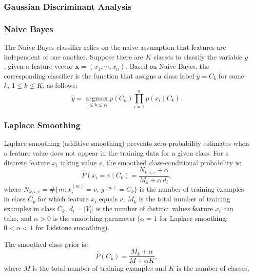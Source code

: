\documentclass{article}
\begin{document}
\subsubsection{Gaussian Discriminant Analysis}
\label{subsubsec:ml:gla:gda}

\subsubsection{Naive Bayes}
\label{subsubsec:ml:gla:nb}
The Naive Bayes classifier relies on the naive assumption that features are independent of one another. Suppose there are $K$ classes to classify the variable $y$, given a feature vector $\mathbf{x} = (x_1, \cdots, x_n)$. Based on Naive Bayes, the corresponding classifier is the function that assigns a class label $\hat{y} = C_k$ for some $k$, $1 \leq k \leq K$, as follows:
\begin{equation}
\label{eq:naive-bayes}
    \hat{y} = \operatorname*{argmax}_{1 \leq k \leq K} p(C_k) \prod_{i=1}^{n} p(x_i \mid C_k).
\end{equation}

\subsubsection{Laplace Smoothing}
\label{subsubsec:ml:gla:laplace-smoothing}
Laplace smoothing (additive smoothing) prevents zero-probability estimates when a feature value does not appear in the training data for a given class. For a discrete feature $x_i$ taking value $v$, the smoothed class-conditional probability is:
\begin{equation}
    \label{eq:laplace-class-cond}
    \hat{P}(x_i = v \mid C_k) = \frac{N_{k,i,v} + \alpha}{M_k + \alpha\, d_i},
\end{equation}
where $N_{k,i,v} = \#\{m : x_i^{(m)} = v,\, y^{(m)} = C_k\}$ is the number of training examples in class $C_k$ for which feature $x_i$ equals $v$, $M_k$ is the total number of training examples in class $C_k$, $d_i = \lvert V_i \rvert$ is the number of distinct values feature $x_i$ can take, and $\alpha > 0$ is the smoothing parameter ($\alpha = 1$ for Laplace smoothing; $0 < \alpha < 1$ for Lidstone smoothing).

The smoothed class prior is:
\begin{equation}
    \label{eq:laplace-prior}
    \hat{P}(C_k) = \frac{M_k + \alpha}{M + \alpha K},
\end{equation}
where $M$ is the total number of training examples and $K$ is the number of classes.
\end{document}
